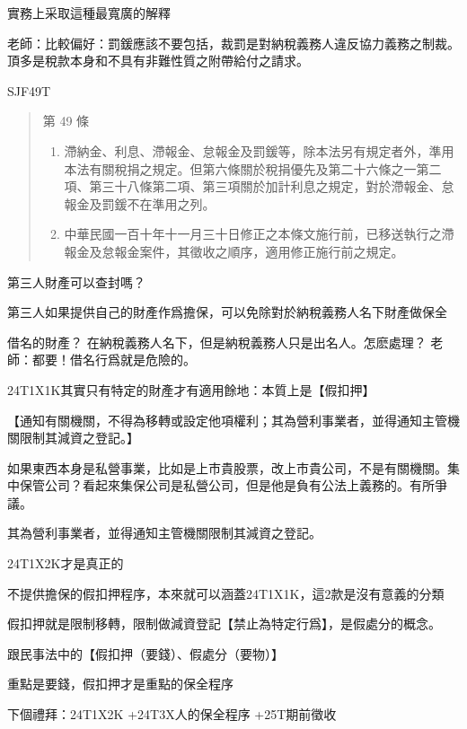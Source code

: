 \documentclass[]{ctexbook}
\providecommand{\tightlist}{%
  \setlength{\itemsep}{0pt}\setlength{\parskip}{0pt}}
\begin{document}
實務上采取這種最寬廣的解釋

老師：比較偏好：罰鍰應該不要包括，裁罰是對納稅義務人違反協力義務之制裁。
頂多是稅款本身和不具有非難性質之附帶給付之請求。

SJF49T

\begin{quote}
第 49 條

\begin{enumerate}
\def\labelenumi{\arabic{enumi}.}
\tightlist
\item
  滯納金、利息、滯報金、怠報金及罰鍰等，除本法另有規定者外，準用本法有關稅捐之規定。但第六條關於稅捐優先及第二十六條之一第二項、第三十八條第二項、第三項關於加計利息之規定，對於滯報金、怠報金及罰鍰不在準用之列。
\item
  中華民國一百十年十一月三十日修正之本條文施行前，已移送執行之滯報金及怠報金案件，其徵收之順序，適用修正施行前之規定。
\end{enumerate}
\end{quote}

第三人財產可以查封嗎？

第三人如果提供自己的財產作爲擔保，可以免除對於納稅義務人名下財產做保全

借名的財產？
在納稅義務人名下，但是納稅義務人只是出名人。怎麽處理？
老師：都要！借名行爲就是危險的。

24T1X1K其實只有特定的財產才有適用餘地：本質上是【假扣押】

【通知有關機關，不得為移轉或設定他項權利；其為營利事業者，並得通知主管機關限制其減資之登記。】

如果東西本身是私營事業，比如是上市貴股票，改上市貴公司，不是有關機關。集中保管公司？看起來集保公司是私營公司，但是他是負有公法上義務的。有所爭議。

其為營利事業者，並得通知主管機關限制其減資之登記。

24T1X2K才是真正的

不提供擔保的假扣押程序，本來就可以涵蓋24T1X1K，這2款是沒有意義的分類

假扣押就是限制移轉，限制做減資登記【禁止為特定行爲】，是假處分的概念。

跟民事法中的【假扣押（要錢）、假處分（要物）】

重點是要錢，假扣押才是重點的保全程序

下個禮拜：24T1X2K
+24T3X人的保全程序
+25T期前徵收



\backmatter
\printindex
\end{document}
